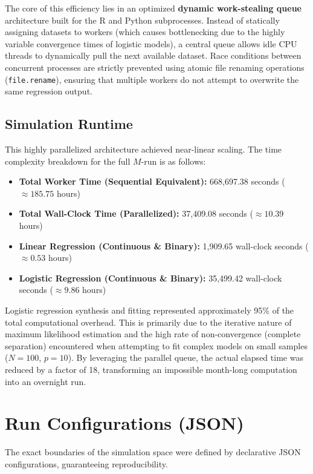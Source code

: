 The core of this efficiency lies in an optimized \textbf{dynamic work-stealing queue} architecture built for the R and Python subprocesses. Instead of statically assigning datasets to workers (which causes bottlenecking due to the highly variable convergence times of logistic models), a central queue allows idle CPU threads to dynamically pull the next available dataset. Race conditions between concurrent processes are strictly prevented using atomic file renaming operations (\texttt{file.rename}), ensuring that multiple workers do not attempt to overwrite the same regression output.

\subsection{Simulation Runtime}
This highly parallelized architecture achieved near-linear scaling. The time complexity breakdown for the full $M$-run is as follows:
\begin{itemize}
    \item \textbf{Total Worker Time (Sequential Equivalent):} 668,697.38 seconds ($\approx 185.75$ hours)
    \item \textbf{Total Wall-Clock Time (Parallelized):} 37,409.08 seconds ($\approx 10.39$ hours)
    \item \textbf{Linear Regression (Continuous \& Binary):} 1,909.65 wall-clock seconds ($\approx 0.53$ hours)
    \item \textbf{Logistic Regression (Continuous \& Binary):} 35,499.42 wall-clock seconds ($\approx 9.86$ hours)
\end{itemize}

Logistic regression synthesis and fitting represented approximately 95\% of the total computational overhead. This is primarily due to the iterative nature of maximum likelihood estimation and the high rate of non-convergence (complete separation) encountered when attempting to fit complex models on small samples ($N=100$, $p=10$). By leveraging the parallel queue, the actual elapsed time was reduced by a factor of 18, transforming an impossible month-long computation into an overnight run.

\section{Run Configurations (JSON)}
\label{sec:app-json}

The exact boundaries of the simulation space were defined by declarative JSON configurations, guaranteeing reproducibility.

